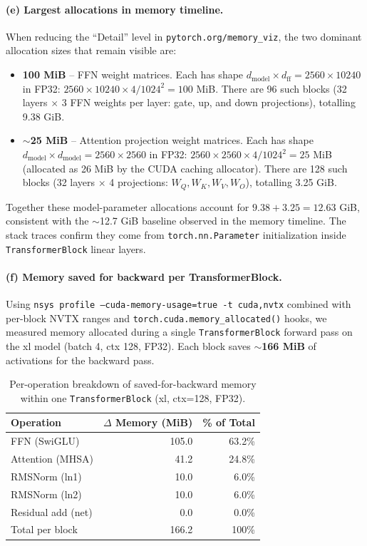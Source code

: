 \documentclass[11pt]{article}
\begin{document}
\paragraph{(e) Largest allocations in memory timeline.}

When reducing the ``Detail'' level in \texttt{pytorch.org/memory\_viz},
the two dominant allocation sizes that remain visible are:

\begin{itemize}
  \item \textbf{100 MiB} -- FFN weight matrices.  Each has shape
    $d_\text{model} \times d_\text{ff} = 2560 \times 10240$ in FP32:
    $2560 \times 10240 \times 4 / 1024^2 = 100$ MiB.
    There are 96 such blocks (32 layers $\times$ 3 FFN weights per
    layer: gate, up, and down projections), totalling 9.38 GiB.
  \item \textbf{$\sim$25 MiB} -- Attention projection weight matrices.
    Each has shape $d_\text{model} \times d_\text{model} = 2560 \times
    2560$ in FP32: $2560 \times 2560 \times 4 / 1024^2 = 25$ MiB
    (allocated as 26 MiB by the CUDA caching allocator).
    There are 128 such blocks (32 layers $\times$ 4 projections:
    $W_Q, W_K, W_V, W_O$), totalling 3.25 GiB.
\end{itemize}

Together these model-parameter allocations account for
$9.38 + 3.25 = 12.63$ GiB, consistent with the $\sim$12.7 GiB baseline
observed in the memory timeline.  The stack traces confirm they come
from \texttt{torch.nn.Parameter} initialization inside
\texttt{TransformerBlock} linear layers.

\paragraph{(f) Memory saved for backward per TransformerBlock.}

Using \texttt{nsys profile --cuda-memory-usage=true -t cuda,nvtx} combined
with per-block NVTX ranges and \texttt{torch.cuda.memory\_allocated()} hooks,
we measured memory allocated during a single \texttt{TransformerBlock}
forward pass on the xl model (batch 4, ctx 128, FP32).  Each block
saves $\sim$\textbf{166 MiB} of activations for the backward pass.

\begin{table}[h]
\centering
\caption{Per-operation breakdown of saved-for-backward memory
  within one \texttt{TransformerBlock} (xl, ctx=128, FP32).}
\label{tab:saved-for-bw}
\begin{tabular}{l r r}
\toprule
Operation & $\Delta$ Memory (MiB) & \% of Total \\
\midrule
FFN (SwiGLU)       & 105.0 & 63.2\% \\
Attention (MHSA)   &  41.2 & 24.8\% \\
RMSNorm (ln1)      &  10.0 &  6.0\% \\
RMSNorm (ln2)      &  10.0 &  6.0\% \\
Residual add (net) &   0.0 &  0.0\% \\
\midrule
Total per block    & 166.2 & 100\% \\
\bottomrule
\end{tabular}
\end{table}
\end{document}
